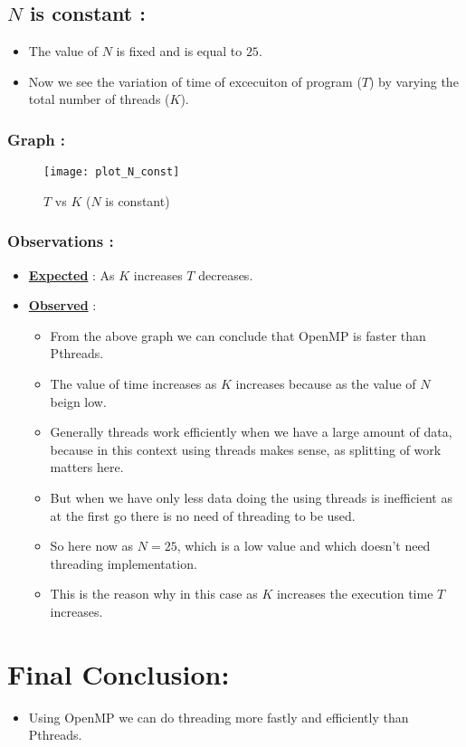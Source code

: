 \documentclass[12pt,a4paper]{article}
\begin{document}
	\subsection{$N$ is constant :}
	\begin{itemize}
		\item The value of $N$ is fixed and is equal to $25$.
		\item Now we see the variation of time of excecuiton of program ($T$) by varying the total number of threads ($K$).
	\end{itemize}
	\subsubsection{Graph :}
	\begin{figure}[H]
		\centering
		\texttt{[image: plot\_N\_const]}
		\caption{$T$ vs $K$ ($N$ is constant)}
	\end{figure}
	\subsubsection{Observations :} 
	\begin{itemize}
		\item \underline{\textbf{Expected}} : As $K$ increases $T$ decreases.
		\item \underline{\textbf{Observed}} : 
		\begin{itemize}
			\item  From the above graph we can conclude that OpenMP is faster than Pthreads.
			\item The value of time increases as $K$ increases because as the value of $N$ beign low.
			\item Generally threads work efficiently when we have a large amount of data, because in this context using threads makes sense, as splitting of work matters here.
			\item But when we have only less data doing the using threads is inefficient as at the first go there is no need of threading to be used.
			\item So here now as $N=25$, which is a low value and which doesn't need threading implementation.
			\item This is the reason why in this case as $K$ increases the execution time $T$ increases. 
		\end{itemize}
	\end{itemize}  		
		\section{ Final Conclusion:} 
		\begin{itemize}
			\item Using OpenMP we can do threading more fastly and efficiently than Pthreads.
		\end{itemize}
\end{document}
